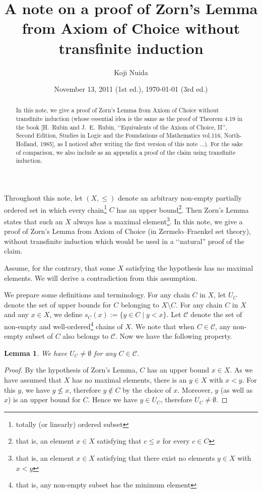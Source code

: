 \documentclass{article}
\title{A note on a proof of Zorn's Lemma from Axiom of Choice without transfinite induction}
\author{Koji Nuida}
\date{November 13, 2011 (1st ed.), \today{} (3rd ed.)}
\newtheorem{lemma}{Lemma}
\begin{document}
\maketitle

\begin{abstract}
In this note, we give a proof of Zorn's Lemma from Axiom of Choice without transfinite induction (whose essential idea is the same as the proof of Theorem 4.19 in the book [H.~Rubin and J.~E.~Rubin, \lq\lq Equivalents of the Axiom of Choice, II\rq\rq, Second Edition, Studies in Logic and the Foundations of Mathematics vol.116, North-Holland, 1985], as I noticed after writing the first version of this note ...).
For the sake of comparison, we also include as an appendix a proof of the claim using transfinite induction.
\end{abstract}

Throughout this note, let $(X,\leq)$ denote an arbitrary non-empty partially ordered set in which every chain\footnote{totally (or linearly) ordered subset} $C$ has an upper bound\footnote{that is, an element $x \in X$ satisfying that $c \leq x$ for every $c \in C$}.
Then Zorn's Lemma states that such an $X$ always has a maximal element\footnote{that is, an element $x \in X$ satisfying that there exist no elements $y \in X$ with $x < y$}.
In this note, we give a proof of Zorn's Lemma from Axiom of Choice (in Zermelo--Fraenkel set theory), without transfinite induction which would be used in a \lq\lq natural'' proof of the claim.

Assume, for the contrary, that some $X$ satisfying the hypothesis has no maximal elements.
We will derive a contradiction from this assumption.

We prepare some definitions and terminology.
For any chain $C$ in $X$, let $U_C$ denote the set of upper bounds for $C$ belonging to $X \setminus C$.
For any chain $C$ in $X$ and any $x \in X$, we define $s_C(x) := \{ y \in C \mid y < x \}$.
Let $\mathcal{C}$ denote the set of non-empty and well-ordered\footnote{that is, any non-empty subset has the minimum element} chains of $X$.
We note that when $C \in \mathcal{C}$, any non-empty subset of $C$ also belongs to $\mathcal{C}$.
Now we have the following property.

\begin{lemma}
    \label{lem:Zorn:chain_has_proper_upper_bound}
    We have $U_C \neq \emptyset$ for any $C \in \mathcal{C}$.
\end{lemma}
\begin{proof}
    By the hypothesis of Zorn's Lemma, $C$ has an upper bound $x \in X$.
    As we have assumed that $X$ has no maximal elements, there is an $y \in X$ with $x < y$.
    For this $y$, we have $y \not\leq x$, therefore $y \not\in C$ by the choice of $x$.
    Moreover, $y$ (as well as $x$) is an upper bound for $C$.
    Hence we have $y \in U_C$, therefore $U_C \neq \emptyset$.
\end{proof}
\end{document}
